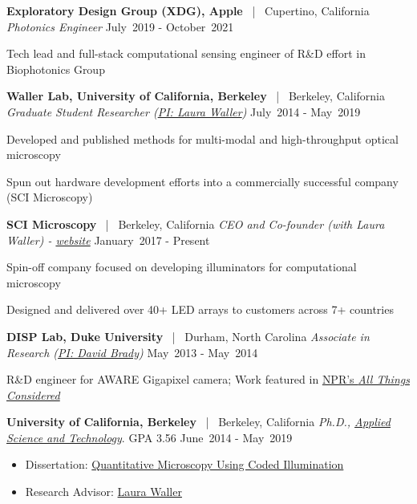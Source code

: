 \documentclass[12pt,letterpaper]{article}
\newenvironment{itemize*}%
{\begin{itemize}%
  \setlength{\itemsep}{0pt}}%
{\end{itemize}}
\newcommand{\mhead}[1]{\leavevmode\marginpar{\sffamily\footnotesize #1}}
\newcommand{\rdate}[1]{{} \hfill #1}
\begin{document}
\textbf{Exploratory Design Group (XDG), \textbf{Apple}} ~|~ Cupertino, California \newline
\emph{Photonics Engineer}  \rdate{{July~2019 - October~2021}}
\begin{itemize*}
  \item Tech lead and full-stack computational sensing engineer of R\&D effort in Biophotonics Group
\end{itemize*}

\smallskip
\textbf{Waller Lab, University of California, Berkeley} ~|~  Berkeley, California \newline
\emph{Graduate Student Researcher (\href{http://www.laurawaller.com}{PI: Laura Waller})} \rdate{July~2014 - May~2019}
\begin{itemize*}
  \item Developed and published methods for multi-modal and high-throughput optical microscopy
  \item Spun out hardware development efforts into a commercially successful company (SCI Microscopy)
\end{itemize*}

\smallskip
\textbf{SCI Microscopy} ~|~ Berkeley, California \newline
\emph{CEO and Co-founder (with Laura Waller) - \href{http://sci-microscopy.com}{website}}\rdate{{January~2017 - Present}}
\begin{itemize*}
  \item Spin-off company focused on developing illuminators for computational microscopy
  \item Designed and delivered over 40+ LED arrays to customers across 7+ countries
\end{itemize*}

\smallskip
\textbf{DISP Lab, \textbf{Duke University}} ~|~ Durham, North Carolina \newline
\emph{Associate in Research (\href{http://www.disp.duke.edu/}{PI: David Brady}) } \rdate{May~2013 - May~2014}
\begin{itemize*}
	\item R\&D engineer for AWARE Gigapixel camera; Work featured in \href{http://www.npr.org/2013/12/10/250000359/supercamera-more-pixels-than-you-know-what-to-do-with}{NPR's \textit{All Things Considered}}
\end{itemize*}

\medskip
\mhead{Education}%
\textbf{University of California, Berkeley} ~|~ Berkeley, California \newline
\emph{Ph.D., \href{http://ast.coe.berkeley.edu/}{Applied Science and Technology}}. GPA 3.56 \rdate{June~2014 - May~2019}
\begin{itemize}
  \item Dissertation: \href{https://escholarship.org/uc/item/70d9j190}{Quantitative Microscopy Using Coded Illumination}
  \item Research Advisor: \href{http://www.laurawaller.com}{Laura Waller}
\end{itemize}
\end{document}
